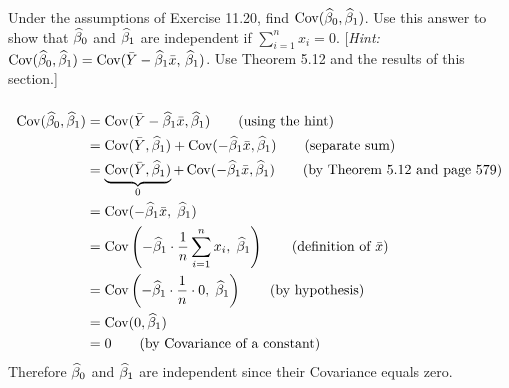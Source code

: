 Under the assumptions of Exercise 11.20, find $\operatorname{Cov}(\widehat{\beta}_0, \widehat{\beta}_1)$. Use this answer to show that $\widehat{\beta}_0$ and $\widehat{\beta}_1$ are independent if $\sum_{i=1}^n x_i = 0$. [\textit{Hint:} $\operatorname{Cov}(\widehat{\beta}_0, \widehat{\beta}_1) = \operatorname{Cov}(\bar{Y} - \widehat{\beta}_1 \bar{x}, \, \widehat{\beta}_1)$. Use Theorem 5.12 and the results of this section.]

\soln* $ $
\begin{align*}
    \Cov(\bat_0, \bat_1) &= \Cov(\Ybar - \bat_1 \xbar, \bat_1) \tag{using the hint}\\
    &= \Cov(\Ybar, \bat_1) + \Cov(- \bat_1 \xbar, \bat_1) \tag{separate sum}\\
    &= \underbrace{\Cov(\Ybar, \bat_1)}_{0} + \Cov(- \bat_1 \xbar, \bat_1) \tag{by Theorem 5.12 and page 579}\\
    &= \Cov(- \bat_1 \xbar,\; \bat_1) \\
    &= \Cov \pars{-\bat_1 \cdot \over{n} \sum_{i=1}^n x_i,\; \bat_1} \tag{definition of $\xbar$}\\
    &= \Cov \pars{-\bat_1 \cdot \over{n} \cdot 0,\; \bat_1} \tag{by hypothesis}\\
    &= \Cov(0, \bat_1)\\
    &= 0 \tag{by Covariance of a constant}
\end{align*}
Therefore $\widehat{\beta}_0$ and $\widehat{\beta}_1$ are independent since their Covariance equals zero.